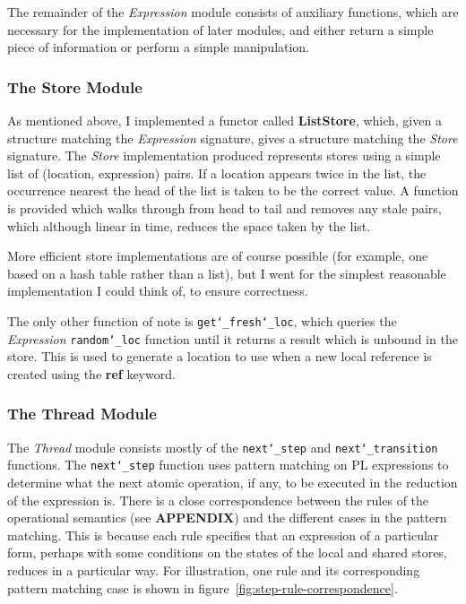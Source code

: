 \documentclass[12pt,a4paper,twoside,openright]{report}
\begin{document}
The remainder of the \emph{Expression} module
consists of auxiliary functions, which are
necessary for the implementation of later
modules, and either return a simple piece
of information or perform a simple manipulation.

\subsubsection{The Store Module}
As mentioned above, I implemented a functor
called \textbf{ListStore}, which, given a structure
matching the \emph{Expression} signature,
gives a structure matching the \emph{Store}
signature. The \emph{Store} implementation produced
represents stores using a simple list of
(location, expression) pairs. If a location
appears twice in the list, the occurrence
nearest the head of the list is taken to be
the correct value. A function is provided
which walks through from head to tail and
removes any stale pairs, which although
linear in time, reduces the space taken
by the list.

More efficient store implementations are of
course possible (for example, one based on
a hash table rather than a list), but
I went for the simplest reasonable
implementation I could think of, to
ensure correctness.

The only other function of note is
\texttt{get\char`_fresh\char`_loc},
which queries the \emph{Expression} \texttt{random\char`_loc}
function until it returns a result which is
unbound in the store. This is used to generate a location
to use when a new local reference is created using the
\textbf{ref} keyword.

\subsubsection{The Thread Module}
The \emph{Thread} module consists mostly of
the \texttt{next\char`_step} and \texttt{next\char`_transition}
functions. The \texttt{next\char`_step} function uses pattern
matching on PL expressions to determine what the next atomic
operation, if any, to be executed in the reduction
of the expression is. There is a close correspondence
between the
rules of the operational semantics (see \textbf{APPENDIX})
and the different cases in the pattern matching. This is
because each rule specifies that an expression of a
particular form, perhaps with some conditions on the
states of the local and shared stores, reduces in a
particular way. For illustration, one rule and its
corresponding pattern matching case is shown in 
figure~\ref{fig:step-rule-correspondence}.
\end{document}
